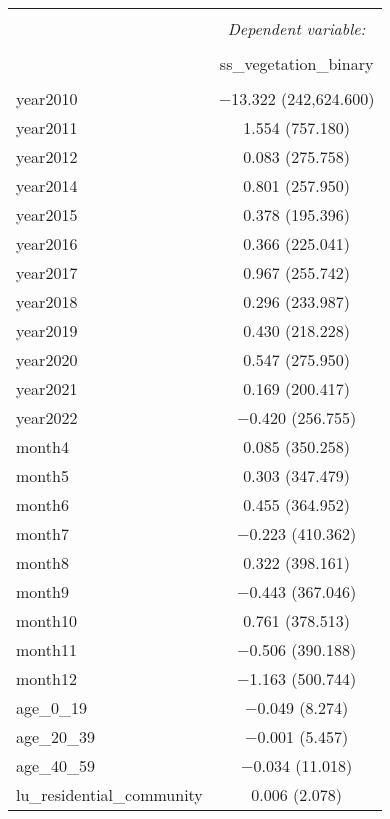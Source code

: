 
\begin{table}[!htbp] \centering 
  \caption{} 
  \label{} 
\small 
\begin{tabular}{@{\extracolsep{1pt}}lc} 
\\[-1.8ex]\hline 
\hline \\[-1.8ex] 
 & \multicolumn{1}{c}{\textit{Dependent variable:}} \\ 
\cline{2-2} 
\\[-1.8ex] & ss\_vegetation\_binary \\ 
\hline \\[-1.8ex] 
 year2010 & $-$13.322 (242,624.600) \\ 
  year2011 & 1.554 (757.180) \\ 
  year2012 & 0.083 (275.758) \\ 
  year2014 & 0.801 (257.950) \\ 
  year2015 & 0.378 (195.396) \\ 
  year2016 & 0.366 (225.041) \\ 
  year2017 & 0.967 (255.742) \\ 
  year2018 & 0.296 (233.987) \\ 
  year2019 & 0.430 (218.228) \\ 
  year2020 & 0.547 (275.950) \\ 
  year2021 & 0.169 (200.417) \\ 
  year2022 & $-$0.420 (256.755) \\ 
  month4 & 0.085 (350.258) \\ 
  month5 & 0.303 (347.479) \\ 
  month6 & 0.455 (364.952) \\ 
  month7 & $-$0.223 (410.362) \\ 
  month8 & 0.322 (398.161) \\ 
  month9 & $-$0.443 (367.046) \\ 
  month10 & 0.761 (378.513) \\ 
  month11 & $-$0.506 (390.188) \\ 
  month12 & $-$1.163 (500.744) \\ 
  age\_0\_19 & $-$0.049 (8.274) \\ 
  age\_20\_39 & $-$0.001 (5.457) \\ 
  age\_40\_59 & $-$0.034 (11.018) \\ 
  lu\_residential\_community & 0.006 (2.078) \\ 

\end{tabular}
\end{table}
